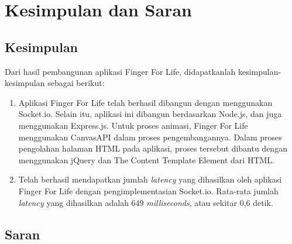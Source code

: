 \chapter{Kesimpulan dan Saran}
\label{kesimpulan}

\section{Kesimpulan}
Dari hasil pembangunan aplikasi Finger For Life, didapatkanlah kesimpulan-kesimpulan sebagai berikut:

\begin{enumerate}
	\item Aplikasi Finger For Life telah berhasil dibangun dengan menggunakan Socket.io. Selain itu, aplikasi ini dibangun berdasarkan Node.js, dan juga menggunakan Express.js. Untuk proses animasi, Finger For Life menggunakan CanvasAPI dalam proses pengembangannya. Dalam proses pengolahan halaman HTML pada aplikasi, proses tersebut dibantu dengan menggunakan jQuery dan The Content Template Element dari HTML.
	
	\item Telah berhasil mendapatkan jumlah \textit{latency} yang dihasilkan oleh aplikasi Finger For Life dengan pengimplementasian Socket.io. Rata-rata jumlah \textit{latency} yang dihasilkan adalah 649 \textit{milliseconds}, atau sekitar 0,6 detik.
\end{enumerate}

\section{Saran}